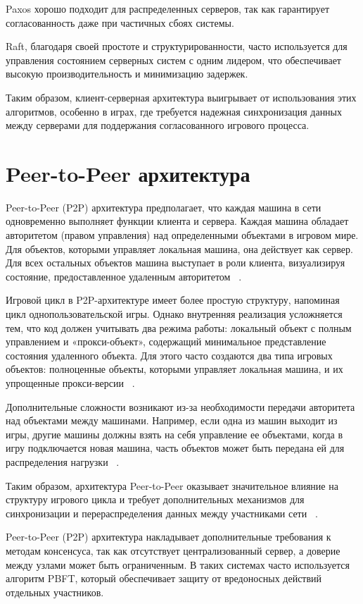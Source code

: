 Paxos хорошо подходит для распределенных серверов, так как гарантирует согласованность даже при частичных сбоях системы.

Raft, благодаря своей простоте и структурированности, часто используется для управления состоянием серверных систем с одним лидером, что обеспечивает высокую производительность и минимизацию задержек.

Таким образом, клиент-серверная архитектура выигрывает от использования этих алгоритмов, особенно в играх, где требуется надежная синхронизация данных между серверами для поддержания согласованного игрового процесса.

\section{Peer-to-Peer архитектура}
Peer-to-Peer (P2P) архитектура предполагает, что каждая машина в сети одновременно выполняет функции клиента и сервера. Каждая машина обладает авторитетом (правом управления) над определенными объектами в игровом мире. Для объектов, которыми управляет локальная машина, она действует как сервер. Для всех остальных объектов машина выступает в роли клиента, визуализируя состояние, предоставленное удаленным авторитетом ~\cite{b4}.

Игровой цикл в P2P-архитектуре имеет более простую структуру, напоминая цикл однопользовательской игры. Однако внутренняя реализация усложняется тем, что код должен учитывать два режима работы: локальный объект с полным управлением и «прокси-объект», содержащий минимальное представление состояния удаленного объекта. Для этого часто создаются два типа игровых объектов: полноценные объекты, которыми управляет локальная машина, и их упрощенные прокси-версии ~\cite{b4}.

Дополнительные сложности возникают из-за необходимости передачи авторитета над объектами между машинами. Например, если одна из машин выходит из игры, другие машины должны взять на себя управление ее объектами, когда в игру подключается новая машина, часть объектов может быть передана ей для распределения нагрузки ~\cite{b4}.

Таким образом, архитектура Peer-to-Peer оказывает значительное влияние на структуру игрового цикла и требует дополнительных механизмов для синхронизации и перераспределения данных между участниками сети ~\cite{b4}.

Peer-to-Peer (P2P) архитектура накладывает дополнительные требования к методам консенсуса, так как отсутствует централизованный сервер, а доверие между узлами может быть ограниченным. В таких системах часто используется алгоритм PBFT, который обеспечивает защиту от вредоносных действий отдельных участников. 

